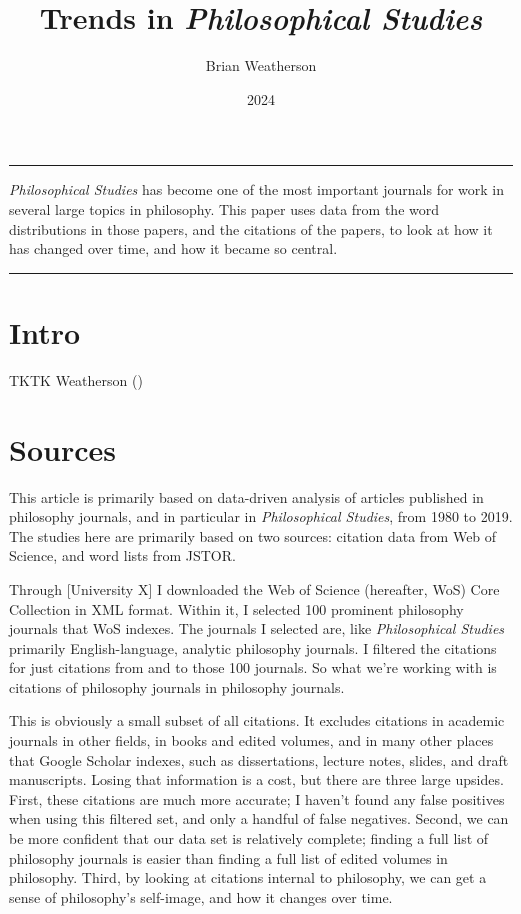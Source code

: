 \documentclass[
  10pt,
  letterpaper,
  DIV=11,
  numbers=noendperiod,
  twoside]{scrartcl}
\title{Trends in \emph{Philosophical Studies}}
\author{Brian Weatherson}
\date{2024}
\renewenvironment{abstract}
 {\vspace{-1.25cm}
 \quotation\small\noindent\rule{\linewidth}{.5pt}\par\smallskip
 \noindent }
 {\par\noindent\rule{\linewidth}{.5pt}\endquotation}
\begin{document}
\maketitle
\begin{abstract}
\emph{Philosophical Studies} has become one of the most important
journals for work in several large topics in philosophy. This paper uses
data from the word distributions in those papers, and the citations of
the papers, to look at how it has changed over time, and how it became
so central.
\end{abstract}

\section{Intro}\label{intro}

TKTK Weatherson ()

\section{Sources}\label{sec-sources}

This article is primarily based on data-driven analysis of articles
published in philosophy journals, and in particular in
\emph{Philosophical Studies}, from 1980 to 2019. The studies here are
primarily based on two sources: citation data from Web of Science, and
word lists from JSTOR.

Through {[}University X{]} I downloaded the Web of Science (hereafter,
WoS) Core Collection in XML format. Within it, I selected 100 prominent
philosophy journals that WoS indexes. The journals I selected are, like
\emph{Philosophical Studies} primarily English-language, analytic
philosophy journals. I filtered the citations for just citations from
and to those 100 journals. So what we're working with is citations of
philosophy journals in philosophy journals.

This is obviously a small subset of all citations. It excludes citations
in academic journals in other fields, in books and edited volumes, and
in many other places that Google Scholar indexes, such as dissertations,
lecture notes, slides, and draft manuscripts. Losing that information is
a cost, but there are three large upsides. First, these citations are
much more accurate; I haven't found any false positives when using this
filtered set, and only a handful of false negatives. Second, we can be
more confident that our data set is relatively complete; finding a full
list of philosophy journals is easier than finding a full list of edited
volumes in philosophy. Third, by looking at citations internal to
philosophy, we can get a sense of philosophy's self-image, and how it
changes over time.
\end{document}
